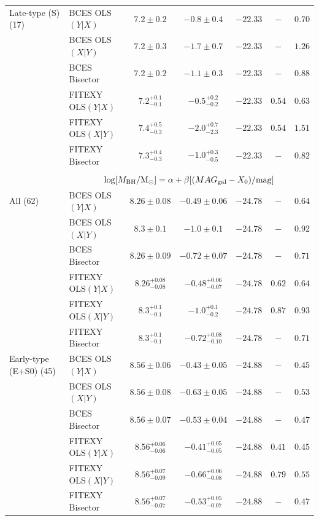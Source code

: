 \documentclass[preprint2]{emulateapj}
\begin{document}
\begin{table}
\begin{tabular}{llccccc}
Late-type (S) (17) & BCES OLS$(Y|X)$   & $7.2 \pm 0.2$ & $-0.8 \pm 0.4$ & $-22.33$ & $-$    & $0.70$ \\
 		   & BCES OLS$(X|Y)$   & $7.2 \pm 0.3$ & $-1.7 \pm 0.7$ & $-22.33$ & $-$    & $1.26$ \\
 		   & BCES Bisector     & $7.2 \pm 0.2$ & $-1.1 \pm 0.3$ & $-22.33$ & $-$    & $0.88$ \\
 		   & FITEXY OLS$(Y|X)$ & $7.2^{+0.1}_{-0.1}$ & $-0.5^{+0.2}_{-0.2}$ & $-22.33$ & $0.54$ & $0.63$ \\
 		   & FITEXY OLS$(X|Y)$ & $7.4^{+0.5}_{-0.3}$ & $-2.0^{+0.7}_{-2.3}$ & $-22.33$ & $0.54$ & $1.51$ \\
 		   & FITEXY Bisector   & $7.3^{+0.4}_{-0.3}$ & $-1.0^{+0.3}_{-0.5}$ & $-22.33$ & $-$    & $0.82$ \\
\hline 
\\
 & \multicolumn{6}{c}{$\log[M_{\rm BH}/{\rm M_\odot}] = \alpha + \beta[(MAG_{\rm gal} - X_0)/{\rm mag}]$} \\ [0.5em]
All (62)               & BCES OLS$(Y|X)$   & $8.26 \pm 0.08$ & $-0.49 \pm 0.06$ & $-24.78$ & $-$ & $0.64$ \\
 		       & BCES OLS$(X|Y)$   & $8.3 \pm 0.1$   & $-1.0 \pm 0.1$   & $-24.78$ & $-$ & $0.92$ \\
 		       & BCES Bisector     & $8.26 \pm 0.09$ & $-0.72 \pm 0.07$ & $-24.78$ & $-$ & $0.71$ \\
 		       & FITEXY OLS$(Y|X)$ & $8.26^{+0.08}_{-0.08}$ & $-0.48^{+0.06}_{-0.07}$ & $-24.78$ & $0.62$ & $0.64$ \\
 		       & FITEXY OLS$(X|Y)$ & $8.3^{+0.1}_{-0.1}$    & $-1.0^{+0.1}_{-0.2}$    & $-24.78$ & $0.87$ & $0.93$ \\
 		       & FITEXY Bisector   & $8.3^{+0.1}_{-0.1}$    & $-0.72^{+0.08}_{-0.10}$ & $-24.78$ & $-$    & $0.71$ \\
		   
Early-type (E+S0) (45) & BCES OLS$(Y|X)$   & $8.56 \pm 0.06$ & $-0.43 \pm 0.05$ & $-24.88$ & $-$ & $0.45$ \\
 		       & BCES OLS$(X|Y)$   & $8.56 \pm 0.08$ & $-0.63 \pm 0.05$ & $-24.88$ & $-$ & $0.53$ \\
 		       & BCES Bisector     & $8.56 \pm 0.07$ & $-0.53 \pm 0.04$ & $-24.88$ & $-$ & $0.47$ \\
 		       & FITEXY OLS$(Y|X)$ & $8.56^{+0.06}_{-0.06}$ & $-0.41^{+0.05}_{-0.05}$ & $-24.88$ & $0.41$ & $0.45$ \\
 		       & FITEXY OLS$(X|Y)$ & $8.56^{+0.07}_{-0.09}$ & $-0.66^{+0.06}_{-0.08}$ & $-24.88$ & $0.79$ & $0.55$ \\
 		       & FITEXY Bisector   & $8.56^{+0.07}_{-0.07}$ & $-0.53^{+0.05}_{-0.07}$ & $-24.88$ & $-$    & $0.47$ \\
		   

\end{tabular}
\end{table}
\end{document}
